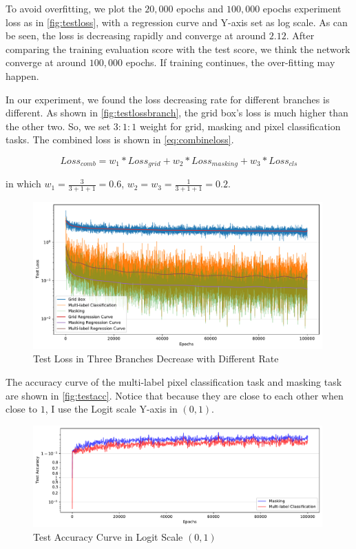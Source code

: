 \begin{spacing}{1.5}
To avoid overfitting, we plot the $20,000$ epochs and $100,000$ epochs experiment loss as in \autoref{fig:testloss}, with a regression curve and Y-axis set as log scale. As can be seen, the loss is decreasing rapidly and converge at around $2.12$. After comparing the training evaluation score with the test score, we think the network converge at around $100,000$ epochs. If training continues, the over-fitting may happen.

In our experiment, we found the loss decreasing rate for different branches is different. As shown in \autoref{fig:testlossbranch}, the grid box's loss is much higher than the other two. So, we set $3:1:1$ weight for grid, masking and pixel classification tasks. The combined loss is shown in \autoref{eq:combineloss}.

\begin{equation}
\label{eq:combineloss}
    Loss_{comb}=w_1*{Loss_{grid}}+w_2*{Loss_{masking}}+w_3*{Loss_{cls}}
\end{equation}

in which $w_1=\frac{3}{3+1+1}=0.6$, $w_2=w_3=\frac{1}{3+1+1}=0.2$.

\begin{figure}[ht]
\centering
\includegraphics[width=0.99\textwidth, fbox]{Chapter5/testlossbranch.pdf}
\caption{Test Loss in Three Branches Decrease with Different Rate}
\label{fig:testlossbranch} 
\end{figure}

The accuracy curve of the multi-label pixel classification task and masking task are shown in \autoref{fig:testacc}. Notice that because they are close to each other when close to $1$, I use the Logit scale Y-axis in $(0,1)$.

\begin{figure}[ht]
\centering
\includegraphics[width=0.99\textwidth, fbox]{Chapter5/testacc.pdf}
\caption{Test Accuracy Curve in Logit Scale $(0,1)$}
\label{fig:testacc} 
\end{figure}


\end{spacing}
